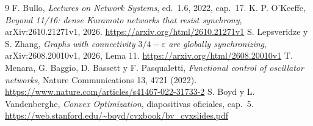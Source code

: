 \documentclass[10pt,a4paper]{article}
\begin{document}
\begin{thebibliography}{9}
 F. Bullo, \emph{Lectures on Network Systems}, ed.\ 1.6, 2022, cap.\ 17.
 K. P. O'Keeffe, \emph{Beyond 11/16: dense Kuramoto networks that resist synchrony}, arXiv:2610.21271v1, 2026. \url{https://arxiv.org/html/2610.21271v1}
 S. Lepsveridze y S. Zhang, \emph{Graphs with connectivity $3/4-\varepsilon$ are globally synchronizing}, arXiv:2608.20010v1, 2026, Lema 11. \url{https://arxiv.org/html/2608.20010v1}
 T. Menara, G. Baggio, D. Bassett y F. Pasqualetti, \emph{Functional control of oscillator networks}, Nature Communications 13, 4721 (2022). \url{https://www.nature.com/articles/s41467-022-31733-2}
 S. Boyd y L. Vandenberghe, \emph{Convex Optimization}, diapositivas oficiales, cap.\ 5. \url{https://web.stanford.edu/~boyd/cvxbook/bv_cvxslides.pdf}
\end{thebibliography}
\end{document}
